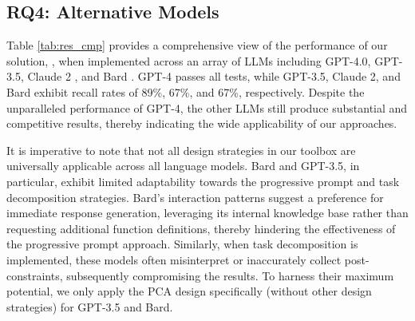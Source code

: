 \subsection{RQ4: Alternative Models}
\label{subsec:expr_comp}



Table \ref{tab:res_cmp} provides a comprehensive view of the performance of our solution, \work, when implemented across an array of LLMs including GPT-4.0, GPT-3.5, Claude 2 \cite{anthropic_2023_claude}, and Bard \cite{krawczyk_bards_2023}. GPT-4 passes all tests, while GPT-3.5, Claude 2, and Bard exhibit recall rates of 89\%, 67\%, and 67\%, respectively. Despite the unparalleled performance of GPT-4, the other LLMs still produce substantial and competitive results, thereby indicating the wide applicability of our approaches.

It is imperative to note that not all design strategies in our toolbox are universally applicable across all language models. Bard and GPT-3.5, in particular, exhibit limited adaptability towards the progressive prompt and task decomposition strategies. Bard's interaction patterns suggest a preference for immediate response generation, leveraging its internal knowledge base rather than requesting additional function definitions, thereby hindering the effectiveness of the progressive prompt approach. Similarly, when task decomposition is implemented, these models often misinterpret or inaccurately collect post-constraints, subsequently compromising the results. To harness their maximum potential, we only apply the PCA design specifically (\ie without other design strategies) for GPT-3.5 and Bard.


